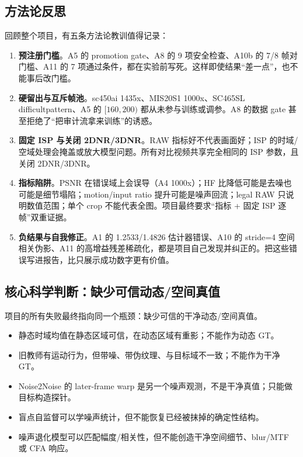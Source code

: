 \documentclass[11pt,a4paper,UTF8,fontset=fandol]{ctexart}
\begin{document}
\subsection{方法论反思}

回顾整个项目，有五条方法论教训值得记录：

\begin{enumerate}
  \item \textbf{预注册门槛}。A5 的 promotion gate、A8 的 9 项安全检查、A10b 的 7/8 帧对门槛、A11 的 7 项通过条件，都在实验前写死。这样即使结果“差一点”，也不能事后改门槛。
  \item \textbf{硬留出与互斥帧池}。sc450ai 1435x、MIS20S1 1000x、SC465SL difficultpattern、A5 的 $[160,200)$ 都从未参与训练或调参。A8 的数据 gate 甚至拒绝了“把审计流拿来训练”的诱惑。
  \item \textbf{固定 ISP 与关闭 2DNR/3DNR}。RAW 指标好不代表画面好；ISP 的时域/空域处理会掩盖或放大模型问题。所有对比视频共享完全相同的 ISP 参数，且关闭 2DNR/3DNR。
  \item \textbf{指标陷阱}。PSNR 在错误域上会误导（A4 1000x）；HF 比降低可能是去噪也可能是细节塌陷；motion/input ratio 提升可能是噪声回流；legal RAW 只说明数值范围；单个 crop 不能代表全图。项目最终要求“指标 + 固定 ISP 逐帧”双重证据。
  \item \textbf{负结果与自我修正}。A1 的 1.2533/1.4826 估计器错误、A10 的 stride=4 空间相关伪影、A11 的高增益残差稀疏化，都是项目自己发现并纠正的。把这些错误写进报告，比只展示成功数字更有价值。
\end{enumerate}

\subsection{核心科学判断：缺少可信动态/空间真值}

项目的所有失败最终指向同一个瓶颈：缺少可信的干净动态/空间真值。

\begin{itemize}
  \item 静态时域均值在静态区域可信，在动态区域有重影；不能作为动态 GT。
  \item 旧教师有运动行为，但带噪、带伪纹理、与目标域不一致；不能作为干净 GT。
  \item Noise2Noise 的 later-frame warp 是另一个噪声观测，不是干净真值；只能做目标构造探针。
  \item 盲点自监督可以学噪声统计，但不能恢复已经被抹掉的确定性结构。
  \item 噪声退化模型可以匹配幅度/相关性，但不能创造干净空间细节、blur/MTF 或 CFA 响应。
\end{itemize}
\end{document}
